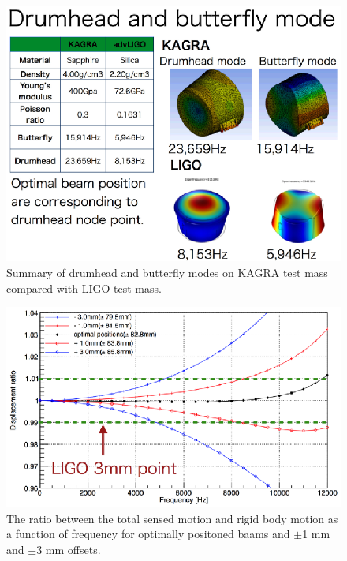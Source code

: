 \begin{figure}
\begin{center}
\includegraphics[width=14cm]{Figures/elmodes.eps}
\caption{Summary of drumhead and butterfly modes on KAGRA test mass 
compared with LIGO test mass.} 
\label{fig:elmodes} 
\end{center}
\end{figure}

\begin{figure}
\begin{center}
\includegraphics[width=14cm]{Figures/edeform.eps}
\caption{The ratio between the total sensed motion and rigid body motion 
as a function of frequency for optimally positoned baams and 
$\pm$1 mm and $\pm$3 mm offsets.} 
\label{fig:edeform} 
\end{center}
\end{figure}

